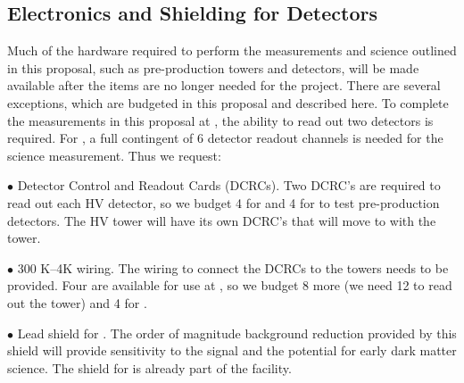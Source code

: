 \subsection{Electronics and Shielding for \SuperCDMS Detectors}

Much of the \scs hardware required to perform the measurements and science outlined in this proposal, such as pre-production towers and detectors, will be made available after the items are no longer needed for the \scs project. There are several exceptions, which are budgeted in this proposal and described here. To complete the measurements in this proposal at \nexus, the ability to read out two detectors is required. For \cute, a full contingent of 6 detector readout channels is needed for the science measurement. Thus we request: 

$\bullet$ Detector Control and Readout Cards (DCRCs). Two DCRC's are required to read out each HV detector, so we budget 4 for \nexus and 4 for \cute to test pre-production detectors. The HV tower will have its own DCRC's that will move to \scs with the tower.

$\bullet$ 300 K--4K wiring. The wiring to connect the DCRCs to the towers needs to be provided. Four are available for use at \cute, so we budget 8 more (we need 12 to read out the tower) and 4 for \nexus.

$\bullet$ Lead shield for \cute. The order of magnitude background reduction provided by this shield will provide sensitivity to the   signal and the potential for early dark matter science. The shield for \nexus is already part of the facility.



